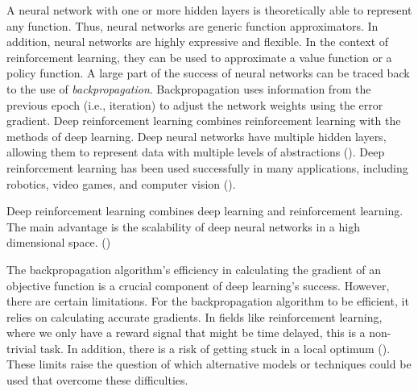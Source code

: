 A neural network with one or more hidden layers is theoretically able to represent any function. Thus, neural networks are generic function approximators. In addition, neural networks are highly expressive and flexible. In the context of reinforcement learning, they can be used to approximate a value function or a policy function. A large part of the success of neural networks can be traced back to the use of \textit{backpropagation}. Backpropagation uses information from the previous epoch (i.e., iteration) to adjust the network weights using the error gradient. Deep reinforcement learning combines reinforcement learning with the methods of deep learning. Deep neural networks have multiple hidden layers, allowing them to represent data with multiple levels of abstractions (\cite{lecun2015deep}). Deep reinforcement learning has been used successfully in many applications, including robotics, video games, and computer vision (\cite{franccois2018introduction}).

Deep reinforcement learning combines deep learning and reinforcement learning. The main advantage is the scalability of deep neural networks in a high dimensional space. (\cite{dong2020deep})

The backpropagation algorithm's efficiency in calculating the gradient of an objective function is a crucial component of deep learning's success. However, there are certain limitations. For the backpropagation algorithm to be efficient, it relies on calculating accurate gradients. In fields like reinforcement learning, where we only have a reward signal that might be time delayed, this is a non-trivial task. In addition, there is a risk of getting stuck in a local optimum (\cite{ha2017visual}). These limits raise the question of which alternative models or techniques could be used that overcome these difficulties.



